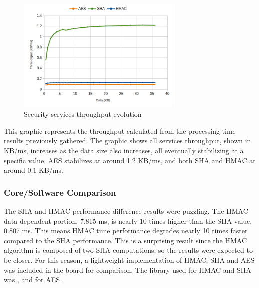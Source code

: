 \begin{figure}[h!]
	\centering
	\includegraphics[width=0.7\textwidth]{./Images/core-tput.png}
	\caption{Security services throughput evolution}
	\label{fig:performance:core-tput}
\end{figure}

This graphic represents the throughput calculated from the processing time results previously gathered. The graphic shows all services throughput, shown in KB/ms, increases as the data size also increases, all eventually stabilizing at a specific value. \ac{AES} stabilizes at around 1.2 KB/ms, and both \ac{SHA} and \ac{HMAC} at around 0.1 KB/ms.

\subsubsection{Core/Software Comparison}\label{chap:evaluation:services:software}

The SHA and HMAC performance difference results were puzzling. The HMAC data dependent portion, 7.815 ms, is nearly 10 times higher than the SHA value, 0.807 ms. This means HMAC time performance degrades nearly 10 times faster compared to the SHA performance. This is a surprising result since the HMAC algorithm is composed of two SHA computations, so the results were expected to be closer.
For this reason, a lightweight implementation of HMAC, SHA and AES was included in the board for comparison. The library used for HMAC and SHA was \cite{ogayHMAC}, and for AES \cite{tinycrypt}. 

